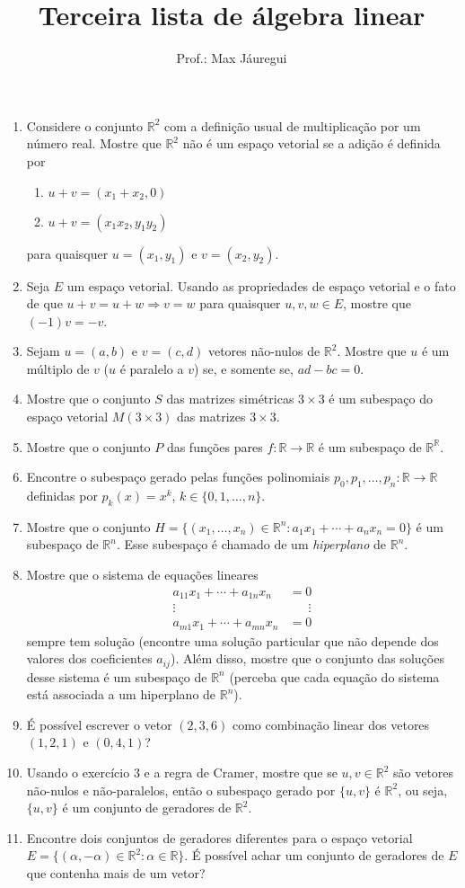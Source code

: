 \documentclass[10pt,a4paper]{article}
\title{Terceira lista de álgebra linear}
\author{Prof.: Max Jáuregui}
\date{}
\newcommand{\R}{\mathbb{R}}
\begin{document}
\maketitle
\begin{enumerate}
\item Considere o conjunto $\R^2$ com a definição usual de multiplicação por um número real. Mostre que $\R^2$ não é um espaço vetorial se a adição é definida por
\begin{enumerate}
	\item $u+v=(x_1+x_2,0)$
	\item $u+v=(x_1x_2,y_1y_2)$
\end{enumerate}
para quaisquer $u=(x_1,y_1)$ e $v=(x_2,y_2)$.
\item Seja $E$ um espaço vetorial. Usando as propriedades de espaço vetorial e o fato de que $u+v=u+w\Rightarrow v=w$ para quaisquer $u,v,w\in E$, mostre que $(-1)v=-v$.
\item Sejam $u=(a,b)$ e $v=(c,d)$ vetores não-nulos de $\R^2$. Mostre que $u$ é um múltiplo de $v$ ($u$ é paralelo a $v$) se, e somente se, $ad-bc=0$.
\item Mostre que o conjunto $S$ das matrizes simétricas $3\times 3$ é um subespaço do espaço vetorial $M(3\times 3)$ das matrizes $3\times 3$.
\item Mostre que o conjunto $P$ das funções pares $f:\R\to\R$ é um subespaço de $\R^\R$.
\item Encontre o subespaço gerado pelas funções polinomiais $p_0,p_1,\ldots,p_n:\R\to\R$ definidas por $p_k(x)=x^k$, $k\in\{0,1,\ldots,n\}$.
\item Mostre que o conjunto $H=\{(x_1,\ldots,x_n)\in\R^n:a_1x_1+\cdots+a_nx_n=0\}$ é um subespaço de $\R^n$. Esse subespaço é chamado de um \emph{hiperplano} de $\R^n$.
\item Mostre que o sistema de equações lineares
\begin{equation*}
	\begin{split}
	a_{11}x_1+\cdots+a_{1n}x_n&=0\\
	\vdots\qquad\qquad&\quad\;\;\vdots\\
	a_{m1}x_1+\cdots+a_{mn}x_n&=0
	\end{split}
\end{equation*}
sempre tem solução (encontre uma solução particular que não depende dos valores dos coeficientes $a_{ij}$). Além disso, mostre que o conjunto das soluções desse sistema é um subespaço de $\R^n$ (perceba que cada equação do sistema está associada a um hiperplano de $\R^n$).
\item É possível escrever o vetor $(2,3,6)$ como combinação linear dos vetores $(1,2,1)$ e $(0,4,1)$?
\item Usando o exercício 3 e a regra de Cramer, mostre que se $u,v\in\R^2$ são vetores não-nulos e não-paralelos, então o subespaço gerado por $\{u,v\}$ é $\R^2$, ou seja, $\{u,v\}$ é um conjunto de geradores de $\R^2$.
\item Encontre dois conjuntos de geradores diferentes para o espaço vetorial $E=\{(\alpha,-\alpha)\in\R^2:\alpha\in\R\}$. É possível achar um conjunto de geradores de $E$ que contenha mais de um vetor?
\end{enumerate}
\end{document}
